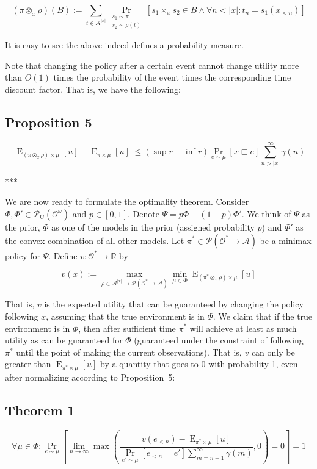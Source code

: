 \documentclass[a4paper]{article}
\DeclareMathOperator{\Prb}{Pr}
\DeclareMathOperator{\E}{E}
\newcommand{\PP}[2]{\operatorname{Pr}_{\substack{#1 \\ #2}}}
\newcommand{\Reals}{\mathbb{R}}
\newcommand{\Abs}[1]{\lvert #1 \rvert}
\newcommand{\Prob}{\mathcal{P}}
\newcommand{\Act}{\mathcal{A}}
\newcommand{\Obs}{\mathcal{O}}
\newcommand{\ObsO}{\Obs^\omega}
\newcommand{\Pol}{\Obs^* \rightarrow \Act}
\newcommand{\CC}{\mathcal{P}_{\operatorname{C}}}
\begin{document}
$$(\pi \otimes_x \rho)(B):=\sum_{t \in \Act^{\Abs{x}}} \PP{s_1 \sim \pi}{s_2 \sim \rho(t)}[s_1 \times_x s_2 \in B \land \forall n < \Abs{x}: t_n=s_1(x_{<n})]$$ 

It is easy to see the above indeed defines a probability measure.

Note that changing the policy after a certain event cannot change utility more than ${O(1)}$ times the probability of the event times the corresponding time discount factor. That is, we have the following:

\subsection{Proposition 5}

$$\Abs{\E_{(\pi \otimes_x \rho) \times \mu}[u]-\E_{\pi \times \mu}[u]} \leq (\sup r - \inf r) \Prb_{e \sim \mu}[x \sqsubset e] \sum_{n > \Abs{x}}^\infty \gamma(n)$$

***

We are now ready to formulate the optimality theorem. Consider ${\Phi,\Phi' \in \CC(\ObsO)}$ and ${p \in [0,1]}$. Denote ${\Psi = p \Phi + (1-p) \Phi'}$. We think of ${\Psi}$ as the prior, ${\Phi}$ as one of the models in the prior (assigned probability ${p}$) and ${\Phi'}$ as the convex combination of all other models. Let ${\pi^* \in \Prob(\Pol)}$ be a minimax policy for ${\Psi}$. Define ${v: \Obs^* \rightarrow \Reals}$ by

$$v(x):=\max_{\rho \in \Act^{\Abs{x}} \rightarrow \Prob(\Pol)} \min_{\mu \in \Phi} \E_{(\pi^* \otimes_x \rho) \times \mu}[u]$$

That is, ${v}$ is the expected utility that can be guaranteed by changing the policy following ${x}$, assuming that the true environment is in ${\Phi}$. We claim that if the true environment is in ${\Phi}$, then after sufficient time ${\pi^*}$ will achieve at least as much utility as can be guaranteed for ${\Phi}$ (guaranteed under the constraint of following ${\pi^*}$ until the point of making the current observations). That is, ${v}$ can only be greater than ${\E_{\pi^* \times \mu}[u]}$ by a quantity that goes to 0 with probability 1, even after normalizing according to Proposition~5:

\subsection{Theorem 1}

$$\forall \mu \in \Phi: \Prb_{e \sim \mu}[\lim_{n \rightarrow \infty} \max(\frac{v(e_{<n})-\E_{\pi^* \times \mu}[u]}{\Prb_{e' \sim \mu}[e_{<n} \sqsubset e'] \sum_{m = n+1}^\infty \gamma(m)},0)=0] = 1$$
\end{document}
